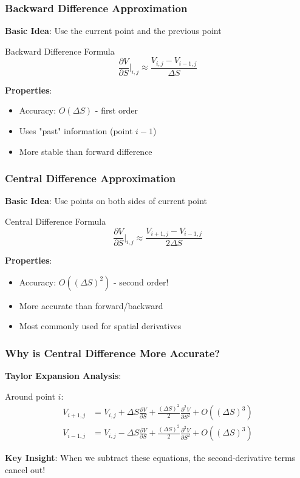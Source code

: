 \documentclass[aspectratio=169]{beamer}
\begin{document}
\begin{frame}
\frametitle{Backward Difference Approximation}
\textbf{Basic Idea}: Use the current point and the previous point

\begin{block}{Backward Difference Formula}
\[\frac{\partial V}{\partial S} \bigg|_{i,j} \approx \frac{V_{i,j} - V_{i-1,j}}{\Delta S}\]
\end{block}

\textbf{Properties}:
\begin{itemize}
\item Accuracy: $O(\Delta S)$ - first order
\item Uses "past" information (point $i-1$)
\item More stable than forward difference
\end{itemize}
\end{frame}

\begin{frame}
\frametitle{Central Difference Approximation}
\textbf{Basic Idea}: Use points on both sides of current point

\begin{block}{Central Difference Formula}
\[\frac{\partial V}{\partial S} \bigg|_{i,j} \approx \frac{V_{i+1,j} - V_{i-1,j}}{2\Delta S}\]
\end{block}

\textbf{Properties}:
\begin{itemize}
\item Accuracy: $O((\Delta S)^2)$ - second order!
\item More accurate than forward/backward
\item Most commonly used for spatial derivatives
\end{itemize}
\end{frame}

\begin{frame}
\frametitle{Why is Central Difference More Accurate?}
\textbf{Taylor Expansion Analysis}:

Around point $i$:
\begin{align}
V_{i+1,j} &= V_{i,j} + \Delta S \frac{\partial V}{\partial S} + \frac{(\Delta S)^2}{2} \frac{\partial^2 V}{\partial S^2} + O((\Delta S)^3) \\
V_{i-1,j} &= V_{i,j} - \Delta S \frac{\partial V}{\partial S} + \frac{(\Delta S)^2}{2} \frac{\partial^2 V}{\partial S^2} + O((\Delta S)^3)
\end{align}

\textbf{Key Insight}: When we subtract these equations, the second-derivative terms cancel out!
\end{frame}
\end{document}

